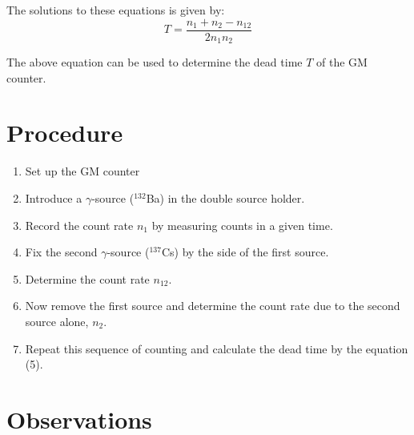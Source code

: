 \documentclass[12pt,a4paper]{article}
\begin{document}
	The solutions to these equations is given by:
	\begin{equation}
		\boxed{T = \dfrac{n_{1} + n_{2} - n_{12}}{2n_{1}n_{2}}}
	\end{equation}
	
	The above equation can be used to determine the dead time $T$ of the GM counter.
	
	\section{Procedure}
	
	\begin{enumerate}
		\item 	Set up the GM counter 
		
		\item 	Introduce a $\gamma$-source ($^{132}$Ba) in the double source holder.
		
		\item 	Record the count rate $n_1$ by measuring counts in a given time.
		
		\item 	Fix the second $\gamma$-source ($^{137}$Cs) by the side of the first source.
		
		\item 	Determine the count rate $n_{12}$.
		
		\item 	Now remove the first source and determine the count rate due to the second source alone, $n_2$.
		
		\item 	Repeat this sequence of counting and calculate the dead time by the equation (5).
	\end{enumerate}
	
	\section{Observations}
		
\end{document}
